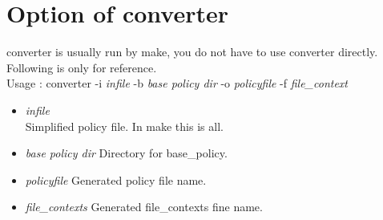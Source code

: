 \section{Option of converter}
converter is usually run by make, you do not have to use converter directly.
Following is only for reference.\\
Usage : converter -i {\it infile} -b {\it base policy dir} -o
{\it policyfile} -f {\it file\_context}\\
\begin{itemize}
 \item {\it infile}\\
       Simplified policy file. In make this is all.
 \item {\it base policy dir}
       Directory for base\_policy.
 \item {\it policyfile}
       Generated policy file name.
 \item {\it file\_contexts}
       Generated file\_contexts fine name.
\end{itemize}
